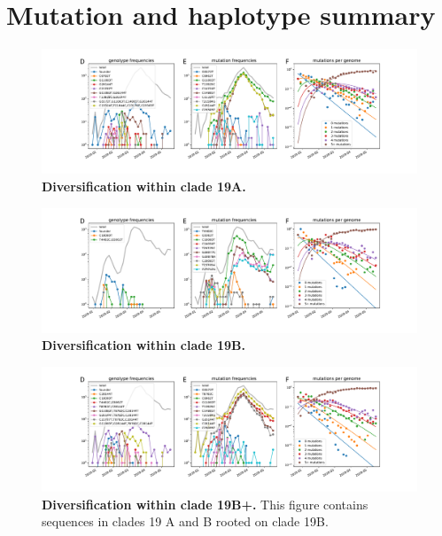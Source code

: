 \section*{Mutation and haplotype summary}

\begin{figure}[h]
    \includegraphics[width=\textwidth]{figures/counts/19A_counts.pdf}
    \caption{{\bf Diversification within clade 19A.}
    \label{fig:19A_counts}}
\end{figure}

\begin{figure}[h]
    \includegraphics[width=\textwidth]{figures/counts/19B_counts.pdf}
    \caption{{\bf Diversification within clade 19B.}
    \label{fig:19B_counts}}
\end{figure}

\begin{figure}[h]
    \includegraphics[width=\textwidth]{figures/counts/19B+_counts.pdf}
    \caption{{\bf Diversification within clade 19B+.}
    This figure contains sequences in clades 19 A and B rooted on clade 19B.
    \label{fig:19B+_counts}}
\end{figure}

